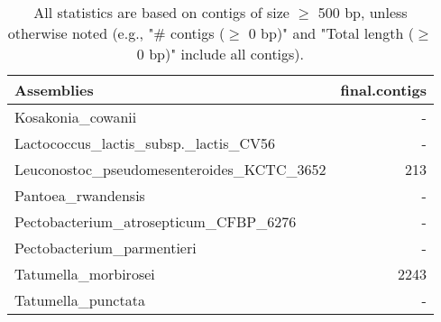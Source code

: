 \documentclass[12pt,a4paper]{article}
\begin{document}
\begin{table}[ht]
\begin{center}
\caption{All statistics are based on contigs of size $\geq$ 500 bp, unless otherwise noted (e.g., "\# contigs ($\geq$ 0 bp)" and "Total length ($\geq$ 0 bp)" include all contigs).}
\begin{tabular}{|l*{1}{|r}|}
\hline
Assemblies & final.contigs \\ \hline
Kosakonia\_cowanii & - \\ \hline
Lactococcus\_lactis\_subsp.\_lactis\_CV56 & - \\ \hline
Leuconostoc\_pseudomesenteroides\_KCTC\_3652 & 213 \\ \hline
Pantoea\_rwandensis & - \\ \hline
Pectobacterium\_atrosepticum\_CFBP\_6276 & - \\ \hline
Pectobacterium\_parmentieri & - \\ \hline
Tatumella\_morbirosei & 2243 \\ \hline
Tatumella\_punctata & - \\ \hline
\end{tabular}
\end{center}
\end{table}
\end{document}
